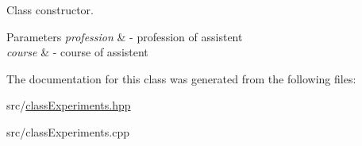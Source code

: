 Class constructor. 


\begin{DoxyParams}{Parameters}
{\em profession} & -\/ profession of assistent \\
\hline
{\em course} & -\/ course of assistent \\
\hline
\end{DoxyParams}


The documentation for this class was generated from the following files\+:\begin{DoxyCompactItemize}
\item 
src/\hyperlink{classExperiments_8hpp}{class\+Experiments.\+hpp}\item 
src/class\+Experiments.\+cpp\end{DoxyCompactItemize}
